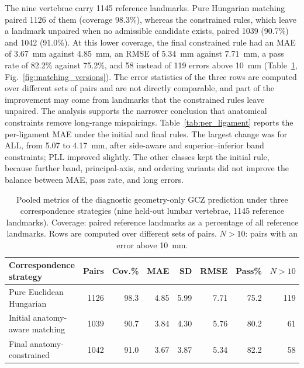 \documentclass[10pt,a4paper]{article}
\begin{document}
The nine vertebrae carry 1145 reference landmarks. Pure Hungarian matching paired 1126 of them (coverage 98.3\%), whereas the constrained rules, which leave a landmark unpaired when no admissible candidate exists, paired 1039 (90.7\%) and 1042 (91.0\%). At this lower coverage, the final constrained rule had an MAE of 3.67~mm against 4.85~mm, an RMSE of 5.34~mm against 7.71~mm, a pass rate of 82.2\% against 75.2\%, and 58 instead of 119 errors above 10~mm (Table~\ref{tab:matching_versions}, Fig.~\ref{fig:matching_versions}). The error statistics of the three rows are computed over different sets of pairs and are not directly comparable, and part of the improvement may come from landmarks that the constrained rules leave unpaired. The analysis supports the narrower conclusion that anatomical constraints remove long-range mispairings. Table~\ref{tab:per_ligament} reports the per-ligament MAE under the initial and final rules. The largest change was for ALL, from 5.07 to 4.17~mm, after side-aware and superior--inferior band constraints; PLL improved slightly. The other classes kept the initial rule, because further band, principal-axis, and ordering variants did not improve the balance between MAE, pass rate, and long errors.

\begin{table}[h]
\centering
\small
\caption{Pooled metrics of the diagnostic geometry-only GCZ prediction under three correspondence strategies (nine held-out lumbar vertebrae, 1145 reference landmarks). Coverage: paired reference landmarks as a percentage of all reference landmarks. Rows are computed over different sets of pairs. $N>10$: pairs with an error above 10~mm.}
\label{tab:matching_versions}
\begin{tabular}{@{}lrrrrrrr@{}}
\toprule
Correspondence strategy & Pairs & Cov.\% & MAE & SD & RMSE & Pass\% & $N>10$ \\
\midrule
Pure Euclidean Hungarian & 1126 & 98.3 & 4.85 & 5.99 & 7.71 & 75.2 & 119 \\
Initial anatomy-aware matching & 1039 & 90.7 & 3.84 & 4.30 & 5.76 & 80.2 & 61 \\
Final anatomy-constrained & 1042 & 91.0 & 3.67 & 3.87 & 5.34 & 82.2 & 58 \\
\bottomrule
\end{tabular}
\end{table}
\end{document}
